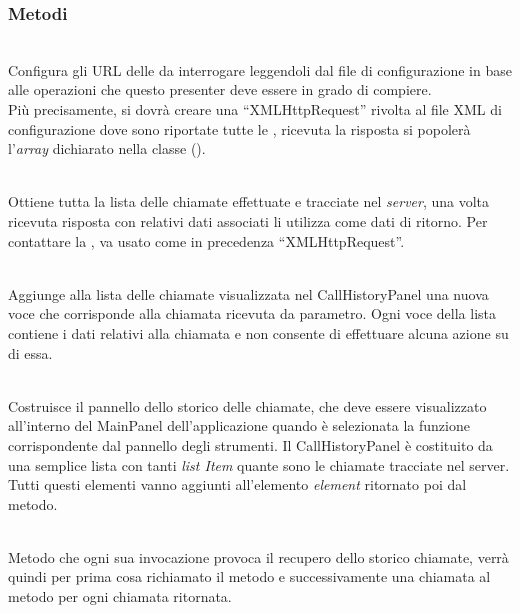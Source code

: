 \subsubsection*{Metodi}
\begin{description}
\item{}\\
Configura gli URL delle  da interrogare leggendoli dal file di configurazione in base alle operazioni che questo presenter deve essere in grado di compiere.\\
Più precisamente, si dovrà creare una ``XMLHttpRequest'' rivolta al file XML di configurazione dove sono riportate tutte le , ricevuta la risposta si popolerà l'\textit{array} dichiarato nella classe ().

\item{}\\
Ottiene tutta la lista delle chiamate effettuate e tracciate nel \textit{server}, una volta ricevuta risposta con relativi dati associati li utilizza come dati di ritorno. Per contattare la , va usato come in precedenza ``XMLHttpRequest''.

\item{}\\
Aggiunge alla lista delle chiamate visualizzata nel CallHistoryPanel una nuova voce che corrisponde alla chiamata ricevuta da parametro. Ogni voce della lista contiene i dati relativi alla chiamata e non consente di effettuare alcuna azione su di essa.

\item{}\\
Costruisce il pannello dello storico delle chiamate, che deve essere visualizzato all'interno del MainPanel dell'applicazione quando è selezionata la funzione corrispondente dal pannello degli strumenti. Il CallHistoryPanel è costituito da una semplice lista con tanti \textit{list Item} quante sono le chiamate tracciate nel server. Tutti questi elementi vanno aggiunti all'elemento \textit{element} ritornato poi dal metodo.

\item{}\\
Metodo che ogni sua invocazione provoca il recupero dello storico chiamate, verrà quindi per prima cosa richiamato il metodo  e successivamente una chiamata al metodo  per ogni chiamata ritornata.

\end{description}

